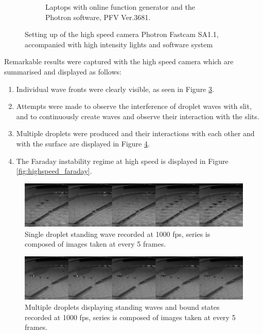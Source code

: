 \begin{figure}[ht]
\begin{subfigure}[t]{0.475\textwidth}
        \caption{Laptops with online function generator and the Photron software, PFV Ver.3681.}
        \label{fig:software_highspeedcamera}
    \end{subfigure}
\caption{Setting up of the high speed camera Photron Fastcam SA1.1, accompanied with high intensity lights and software system}
\label{fig:highspeed_setup}
\end{figure}

Remarkable results were captured with the high speed camera which are summarised and displayed as follows:
\begin{enumerate}
\item  Individual wave fronts were clearly visible, as seen in Figure \ref{fig:highspeed_wave}.
\item  Attempts were made to observe the interference of droplet waves with slit, and to continuously create waves and observe their interaction with  the slits.
\item  Multiple droplets were produced and their interactions with each  other and with the surface are displayed in Figure \ref{fig:highspeed_multiple}.
\item  The Faraday instability regime at high speed is displayed in  Figure \ref{fig:highspeed_faraday}.
\end{enumerate}

\begin{figure}[htb]
\includegraphics[width=\textwidth]{prototype/exp_rep_imgs/highspeed_wave.jpg}
\centering
\caption{Single droplet standing wave recorded at 1000 fps, series is composed of images taken at every 5 frames.}
\centering
\label{fig:highspeed_wave}
\end{figure}

\begin{figure}[htb]
\includegraphics[width=\textwidth]{prototype/exp_rep_imgs/highspeed_multiple.jpg}
\centering
\caption{Multiple droplets displaying standing waves and bound states recorded at 1000 fps, series is composed of images taken at every 5 frames.}
\centering
\label{fig:highspeed_multiple}
\end{figure}

